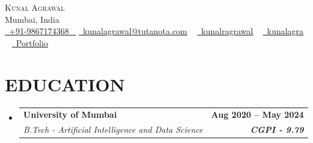 \documentclass[letterpaper,11pt]{article}
\makeatletter
\newcommand{\resumeItem}[1]{
  \item\small{
    {#1 \vspace{-2pt}}
  }
}
\newcommand{\resumeSubheading}[4]{
  \vspace{-2pt}\item
    \begin{tabular*}{1.0\textwidth}[t]{l@{\extracolsep{\fill}}r}
      \textbf{\large#1} & \textbf{\small #2} \\
      \textit{\large#3} & \textit{\small #4} \\
      
    \end{tabular*}\vspace{-7pt}
}
\newcommand{\resumeSubHeadingListStart}{\begin{itemize}[leftmargin=0.0in, label={}]}
\newcommand{\resumeSubHeadingListEnd}{\end{itemize}}
\makeatother
\begin{document}


\begin{center}
    {\Huge \scshape {Kunal Agrawal}} \\ \vspace{1pt}
    Mumbai, India \\ \vspace{1pt}
    \small \href{tel:+919867174368}{ \raisebox{-0.1\height}{\faPhone}\ \underline{+91-9867174368} ~} \href{mailto:kunalagrawal@tutanota.com}{\raisebox{-0.2\height}{\faEnvelope[regular]}\  \underline{kunalagrawal@tutanota.com}} ~ 
    \href{https://linkedin.com/in/kunalragrawal}{\raisebox{-0.2\height}\faLinkedinIn\ \underline{kunalragrawal}}  ~
    \href{https://github.com/kunalagra}{\raisebox{-0.2\height}\faGithub\ \underline{kunalagra}} ~
    \href{https://kunalagrawal.vercel.app/}{\raisebox{-0.2\height}{\faLink}\ \underline{Portfolio}}
    \vspace{-8pt}
\end{center}


\section{EDUCATION}
  \resumeSubHeadingListStart
    \resumeSubheading
      {University of Mumbai}{Aug 2020 -- May 2024}
      {B.Tech - Artificial Intelligence and Data Science}{\textbf{CGPI - 9.79}}
  
      
  \resumeSubHeadingListEnd
  

\end{document}
